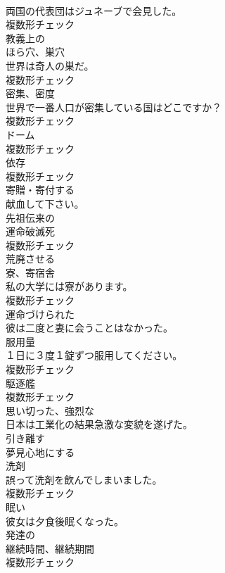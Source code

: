 \documentclass[8pt]{extreport}
\begin{document}
\begin{CJK}{UTF8}{min}
\\	両国の代表団はジュネーブで会見した。	
\\	複数形チェック
\\	[形容詞]	教義上の	
\\	[名詞]	ほら穴、巣穴	
\\	世界は奇人の巣だ。	
\\	複数形チェック
\\	[名詞]	密集、密度	
\\	世界で一番人口が密集している国はどこですか？	
\\	複数形チェック
\\	[名詞]	ドーム	
\\	複数形チェック
\\	[名詞]	依存	
\\	複数形チェック
\\	[動詞]	寄贈・寄付する	
\\	献血して下さい。	
\\	[形容詞]	先祖伝来の	
\\	[名詞]	運命破滅死	
\\	複数形チェック
\\	[動詞]	荒廃させる	
\\	[名詞]	寮、寄宿舎	
\\	私の大学には寮があります。	
\\	複数形チェック
\\	[形容詞]	運命づけられた	
\\	彼は二度と妻に会うことはなかった。	
\\	[名詞]	服用量	
\\	１日に３度１錠ずつ服用してください。	
\\	複数形チェック
\\	[名詞]	駆逐艦	
\\	複数形チェック
\\	[形容詞]	思い切った、強烈な	
\\	日本は工業化の結果急激な変貌を遂げた。	
\\	[動詞]	引き離す	
\\	[形容詞]	夢見心地にする	
\\	[名詞]	洗剤	
\\	誤って洗剤を飲んでしまいました。	
\\	複数形チェック
\\	[形容詞]	眠い	
\\	彼女は夕食後眠くなった。	
\\	[形容詞]	発達の	
\\	[名詞]	継続時間、継続期間	
\\	複数形チェック

\end{CJK}
\end{document}

